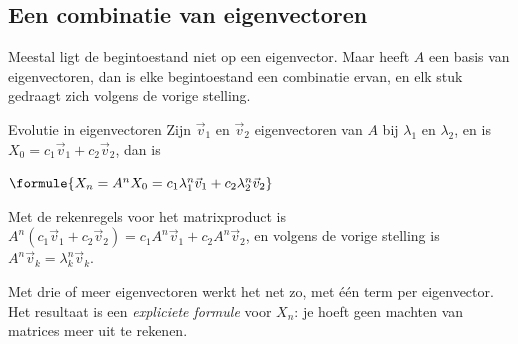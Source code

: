 \begin{oefeningen}
\end{oefeningen}

\subsection{Een combinatie van eigenvectoren}

Meestal ligt de begintoestand niet op een eigenvector. Maar heeft $A$ een basis van eigenvectoren, dan is elke begintoestand een combinatie ervan, en elk stuk gedraagt zich volgens de vorige stelling.

\begin{theorie}
\begin{stelling}{Evolutie in eigenvectoren}
Zijn $\vec v_1$ en $\vec v_2$ eigenvectoren van $A$ bij $\lambda_1$ en $\lambda_2$, en is $X_0 = c_1\vec v_1 + c_2\vec v_2$, dan is

\vspace{1mm}
\qquad $\formule{X_n = A^nX_0 = c_1\lambda_1^n\vec v_1 + c_2\lambda_2^n\vec v_2}$
\end{stelling}

\begin{bewijs}
Met de rekenregels voor het matrixproduct is $A^n(c_1\vec v_1 + c_2\vec v_2) = c_1A^n\vec v_1 + c_2A^n\vec v_2$, en volgens de vorige stelling is $A^n\vec v_k = \lambda_k^n\vec v_k$.
\end{bewijs}
\end{theorie}

Met drie of meer eigenvectoren werkt het net zo, met één term per eigenvector. Het resultaat is een \textit{expliciete formule} voor $X_n$: je hoeft geen machten van matrices meer uit te rekenen.

